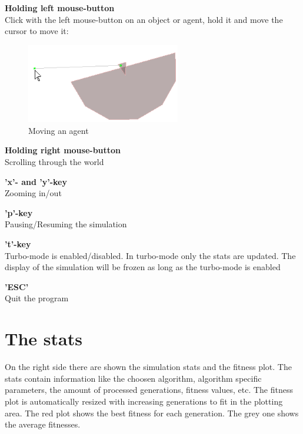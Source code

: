 \documentclass[10pt,a4paper,DIV=11]{scrreprt}
\begin{document}
\begin{LARGE}
\textbf{Holding left mouse-button} \\
Click with the left mouse-button on an object or agent, hold it and move the cursor to move it:

\begin{center}
	\begin{figure}[H]
		\centering
		\includegraphics[width=0.6\textwidth,scale=1]{sim_leftmouse.png}  
		\caption{Moving an agent}
		\label{fig:leftmouse}
	\end{figure}
\end{center}



\textbf{Holding right mouse-button} \\
Scrolling through the world 

\textbf{'x'- and 'y'-key} \\
Zooming in/out

\textbf{'p'-key} \\
Pausing/Resuming the simulation 

\textbf{'t'-key} \\
Turbo-mode is enabled/disabled.
In turbo-mode only the stats are updated. The display of the simulation will be frozen as long as the turbo-mode is enabled 

\textbf{'ESC'} \\
Quit the program

\section{The stats}
On the right side there are shown the simulation stats and the fitness plot.
The stats contain information like the choosen algorithm, algorithm specific parameters, the amount of processed generations, fitness values, etc.
The fitness plot is automatically resized with increasing generations to fit in the plotting area. The red plot shows the best fitness for each generation. The grey one shows the average fitnesses.


\end{LARGE}
\end{document}
